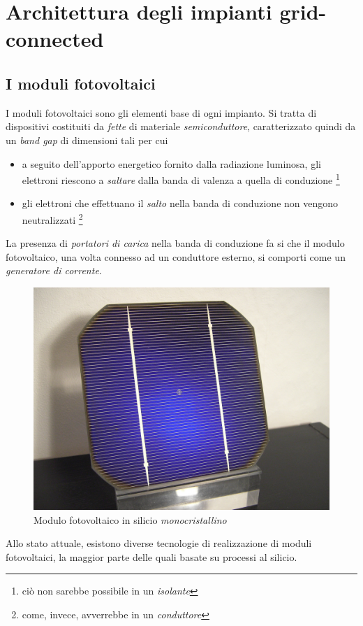 %
\section{Architettura degli impianti grid-connected}
\subsection{I moduli fotovoltaici}
I moduli fotovoltaici sono gli elementi base di ogni impianto. 
Si tratta di dispositivi costituiti da \emph{fette} di materiale 
\emph{semiconduttore}, caratterizzato quindi da un \emph{band gap} 
di dimensioni tali per cui 
%
\begin{itemize}
\item a seguito dell'apporto energetico fornito dalla radiazione luminosa, 
      gli elettroni riescono a \emph{saltare} dalla banda di valenza a 
      quella di conduzione
      \footnote{ci\`o non sarebbe possibile in un \emph{isolante}}
%
\item gli elettroni che effettuano il \emph{salto} nella banda di conduzione 
      non vengono neutralizzati
      \footnote{come, invece, avverrebbe in un \emph{conduttore}}
\end{itemize}
%
La presenza di \emph{portatori di carica} nella banda di conduzione 
fa si che il modulo fotovoltaico, una volta connesso ad un conduttore 
esterno, si comporti come un \emph{generatore di corrente}\cite{bellini09}.
%
\begin{figure}[!h]
\centering
\includegraphics[width=350pt]{img/modulo-fotovoltaico.jpg}
\caption{Modulo fotovoltaico in silicio \emph{monocristallino}}
\end{figure}
%
Allo stato attuale, esistono diverse tecnologie di realizzazione di 
moduli fotovoltaici, la maggior parte delle quali basate su processi 
al silicio.
%

